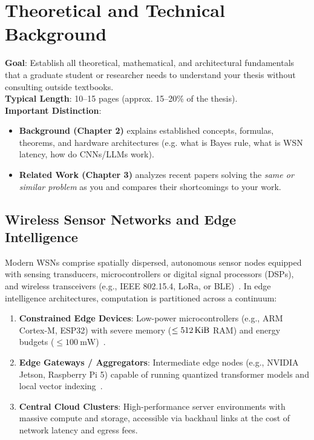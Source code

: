 
\chapter{Theoretical and Technical Background}
\label{ch:background}

\begin{takeawaybox}
\textbf{Goal}: Establish all theoretical, mathematical, and architectural fundamentals that a graduate student or researcher needs to understand your thesis without consulting outside textbooks.\\
\textbf{Typical Length}: 10--15 pages (approx. 15--20\% of the thesis).\\
\textbf{Important Distinction}:
\begin{itemize}[leftmargin=*]
    \item \textbf{Background (Chapter 2)} explains established concepts, formulas, theorems, and hardware architectures (e.g. what is Bayes rule, what is WSN latency, how do CNNs/LLMs work).
    \item \textbf{Related Work (Chapter 3)} analyzes recent papers solving the \emph{same or similar problem} as you and compares their shortcomings to your work.
\end{itemize}
\end{takeawaybox}

\section{Wireless Sensor Networks and Edge Intelligence}
\label{sec:bg_wsn}

Modern \acp{WSN} comprise spatially dispersed, autonomous sensor nodes equipped with sensing transducers, microcontrollers or digital signal processors (\acp{DSP}), and wireless transceivers (e.g., IEEE 802.15.4, \ac{LoRa}, or \ac{BLE})~\cite{akyildiz2002wireless,rappaport2002wireless,tanenbaum2021computer,buttyan2010application}. In edge intelligence architectures, computation is partitioned across a continuum:
\begin{enumerate}
    \item \textbf{Constrained Edge Devices}: Low-power microcontrollers (e.g., ARM Cortex-M, ESP32) with severe memory ($\le \SI{512}{\kibi\byte}$ RAM) and energy budgets ($\le \SI{100}{\milli\watt}$)~\cite{piotrowski2006public}.
    \item \textbf{Edge Gateways / Aggregators}: Intermediate edge nodes (e.g., NVIDIA Jetson, Raspberry Pi 5) capable of running quantized transformer models and local vector indexing~\cite{shi2016edge,mao2017survey}.
    \item \textbf{Central Cloud Clusters}: High-performance server environments with massive compute and storage, accessible via backhaul links at the cost of network latency and egress fees.
\end{enumerate}

